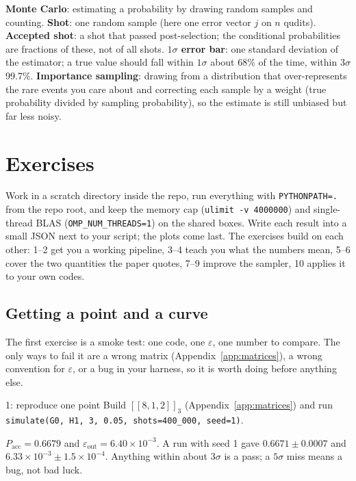 \documentclass[11pt]{article}
\newcommand{\eps}{\varepsilon}
\newcommand{\code}[1]{\texttt{#1}}
\begin{document}
\begin{vocab}
\textbf{Monte Carlo}: estimating a probability by drawing random samples and
counting.
\textbf{Shot}: one random sample (here one error vector $j$ on $n$ qudits).
\textbf{Accepted shot}: a shot that passed post-selection; the conditional
probabilities are fractions of these, not of all shots.
\textbf{$1\sigma$ error bar}: one standard deviation of the estimator; a true value
should fall within $1\sigma$ about 68\% of the time, within $3\sigma$ 99.7\%.
\textbf{Importance sampling}: drawing from a distribution that over-represents the
rare events you care about and correcting each sample by a weight
(true probability divided by sampling probability), so the estimate is still
unbiased but far less noisy.
\end{vocab}

\section{Exercises}
\label{sec:ex}

Work in a scratch directory inside the repo, run everything with
\code{PYTHONPATH=.} from the repo root, and keep the memory cap
(\code{ulimit -v 4000000}) and single-thread BLAS (\code{OMP\_NUM\_THREADS=1}) on the
shared boxes. Write each result into a small JSON next to your script; the plots
come last. The exercises build on each other: 1--2 get you a working pipeline, 3--4
teach you what the numbers mean, 5--6 cover the two quantities the paper quotes, 7--9
improve the sampler, 10 applies it to your own codes.

\subsection*{Getting a point and a curve}

The first exercise is a smoke test: one code, one $\eps$, one number to compare. The
only ways to fail it are a wrong matrix (Appendix~\ref{app:matrices}), a wrong
convention for $\eps$, or a bug in your harness, so it is worth doing before anything
else.

\begin{exercise}{1: reproduce one point}
Build $[[8,1,2]]_3$ (Appendix~\ref{app:matrices}) and run
\code{simulate(G0, H1, 3, 0.05, shots=400\_000, seed=1)}.
\end{exercise}
\begin{checkbox}
$P_{\mathrm{acc}} = 0.6679$ and $\eps_{\mathrm{out}} = 6.40\times10^{-3}$. A run with
seed 1 gave $0.6671\pm0.0007$ and $6.33\times10^{-3}\pm1.5\times10^{-4}$. Anything
within about $3\sigma$ is a pass; a $5\sigma$ miss means a bug, not bad luck.
\end{checkbox}
\end{document}
